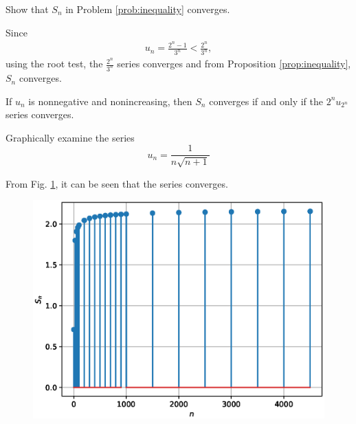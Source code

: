 \documentclass[journal,12pt,twocolumn]{IEEEtran}
\begin{document}
%

\begin{problem}
Show that $S_n$ in Problem \ref{prob:inequality} converges.
\end{problem}
\solution Since
\begin{align}
u_{n}=\frac{2^n-1}{3^n} < \frac{2^n}{3^n},
\end{align}
using the root test, the $\frac{2^n}{3^n}$ series converges and from Proposition \ref{prop:inequality}, $S_n$ converges.

\begin{proposition}
If $u_n$ is nonnegative and nonincreasing, then $S_n$ converges if and only if the $2^nu_{2^n}$ series converges.
\end{proposition}
\begin{problem}
Graphically examine the series 
\begin{equation}
u_{n}=\frac{1}{n\sqrt{n+1}}
\end{equation}
\end{problem}
\solution From Fig. \ref{fig:6}, it can be seen that the series converges.
%

%
\begin{figure}[!ht]
\begin{center}
\includegraphics[width=\columnwidth]{./figs/6.eps}
\end{center}
\label{fig:6}	
\end{figure}
\end{document}
